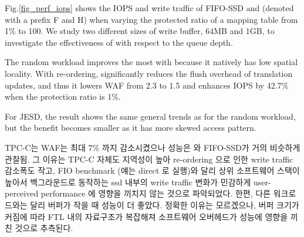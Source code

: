 Fig.\ref{fig_perf_iops} shows the IOPS and write traffic of FIFO-SSD and \ours{} (denoted with a prefix F and H) when varying the protected ratio of a mapping table from 1\% to 100. 
We study two different sizes of write
buffer, 64MB and 1GB, to investigate the effectiveness of \ours{} with respect
to the queue depth. 
\iffalse
랜덤 워크로드에서 Hexa-SSD의 성능 향상폭이 가장 큼. mapping table locality 가 낮아 protected ratio 가 낮으면 mapping table flush 로 인한 traffic 증가가 컸음. 
\ours{}는 buffer 내의 request re-ordering 을 통해 mapping table flush overhead 를 거의 제거함. 
이에 protected ratio 가 1\% 이고 WB가 1GB일 때, WAF를 기존 2.3 인 것을 1.5로 낮춤. 
이에 따른 성능향상도 1.4x 가 됨. 
\fi

The random workload improves the most with \ours{} because it natively has low spatial locality.
With re-ordering, \ours{} significantly reduces the flush overhead of translation updates, and thus it 
lowers WAF from 2.3 to 1.5 and enhances IOPS by 42.7\% when the protection ratio is 1\%. 
\iffalse
JESD에서도 전체적인 트렌드는 비슷하나 write traffic 의 감소폭과 성능향상폭은 다소 줄어들었다. 
그 이유는 JESD워크로드가 원래random 보다 mapping table update 에 locality 가 있기 때문임. 
이에 protected ratio 가 1\% 일때 WAF는 1.8과 1.7이던 것이 1.3과 1.5로 감소함. 
성능은 최대 13\% 향상됨. 
\fi
For JESD, the result shows the same general trends as for the random workload, but the benefit 
becomes smaller as it has more skewed access pattern.

TPC-C는 WAF는 최대 7\% 까지 감소시켰으나 성능은 \ours{}와 FIFO-SSD가 거의 비슷하게 관찰됨. 
그 이유는 TPC-C 자체도 지역성이 높아 re-ordering 으로 인한 write traffic 감소폭도 작고, FIO benchmark (얘는 direct 로 실행)와 달리 상위 소프트웨어 스택이 높아서 백그라운드로 동작하는 ssd 내부의 write traffic 변화가 민감하게 user-perceived performance 에 영향을 끼치지 않는 것으로 파악되었다. 
한편, 다른 워크로드와는 달리 버퍼가 작을 때 성능이 더 좋았다. 정확한 이유는 모르겠으나, 버퍼 크기가 커짐에 따라 FTL 내의 자료구조가 복잡해져 소프트웨어 오버헤드가 성능에 영향을 끼친 것으로 추측된다. 

\iffalse
When the protected ratio is less than 10\%, \ours{} has improved the performance by up to XX\% compared to the existing FIFO version.
Compared with full protection SSD, when the protected ratio is 1\%, FIFO performance degradation occurs more than XX\%-XX\%, whereas in \ours{}, performance degradation is XX\% - XX\%. This performance enhancement is achieved by significantly reducing the cost of flushing overflew dirty pages to the SSD through the in-buffer re-ordering.
\fi
\iffalse
protected ratio 가 10\% 이하일 때 DAWID 이 기존 FIFO 방식 버전보다 최대 XX\%
성능을 향상시켰다.  Full protected 경우와 비교하면 protected ratio 가 1\%로
줄어들 때 FIFO는 성능저하가 XX\%-XX\% 이상 발생하는 반면, DAWID은 성능저하가
XX\% - XX\% 에 머물렀다.  이러한 성능향상 효과는 mapping table 의 영속성을 위해
dirty page 를 SSD에 flush 하는 오버헤드를 in-buffer re-ordering 을 통해 상당히
많이 줄였기 때문이다. 
Fig.~\ref{fio_perf_wt}에서 보는바와 같이 DAWID은 protected ratio 가 작을 때에도
mapping table flush 오버헤드를 거의 없애 FIFO 대비 쓰기량을 최대 XX\%까지 절감하였다. 
\fi

